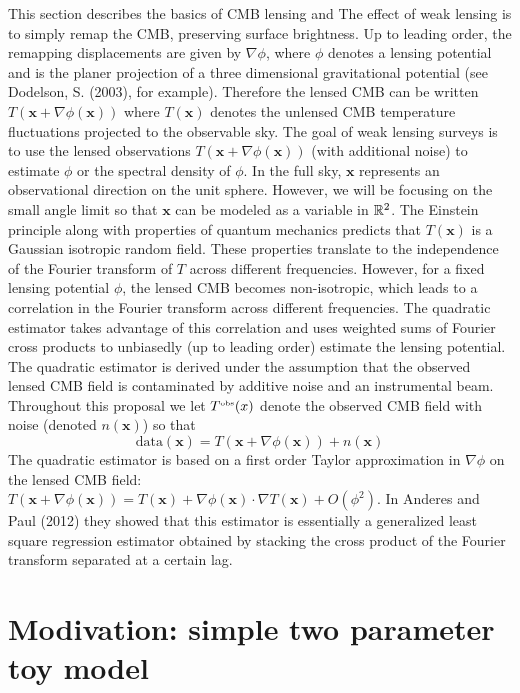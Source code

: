 \documentclass[noinfoline]{imsart}
\newcommand{\bx}{\boldsymbol x}
\begin{document}
This section describes the  basics of CMB lensing and The effect of weak lensing is to simply remap the CMB, preserving surface brightness.   Up to leading order, the remapping  displacements are given by $\nabla \phi$, where $\phi$ denotes a lensing potential and is the planer projection of a three dimensional gravitational potential (see Dodelson, S. (2003), for example). Therefore the lensed CMB can  be written $T(\bx + \nabla \phi(\bx))$ where $T(\bx)$ denotes the unlensed CMB temperature fluctuations projected to the observable sky.
The goal of weak lensing surveys is to use the lensed observations $T(\bx + \nabla \phi(\bx))$  (with additional noise) to  estimate $\phi$ or the spectral density of $\phi$.  In the full sky, $\bx$ represents an observational direction on the unit sphere. However, we will be focusing on the small angle limit  so that $\bx$ can be modeled as a variable in $ \Bbb R^2$.  The Einstein principle along with properties of quantum mechanics predicts that $T(\bx)$   is a Gaussian  isotropic random field. These properties translate to  the independence of the Fourier transform of $T$ across different frequencies.
 However, for a fixed lensing potential $\phi$, the lensed CMB  becomes non-isotropic, which leads to a correlation in the Fourier transform across different frequencies. The quadratic estimator   takes advantage of this correlation and uses weighted sums of Fourier  cross products to unbiasedly (up to leading order) estimate the lensing potential.
The quadratic estimator is derived under the assumption that the observed lensed CMB field is contaminated by additive noise and an instrumental beam. Throughout this proposal we let  $T^\text{\tiny obs}(x)$ denote the observed CMB field  with  noise (denoted $n(\bx)$) so that  
\[ \text{data}(\bx)= T(\bx + \nabla \phi(\bx))+ n(\bx)
 \]
The quadratic estimator is based on a first order Taylor approximation in $\nabla \phi $ on the lensed CMB field:
$T(\bx+\nabla \phi(\bx))= T(\bx) + \nabla \phi(\bx)\cdot \nabla T(\bx)+ O(\phi^2)$. 
In Anderes and Paul (2012) they showed that this estimator is essentially  a generalized least square regression estimator obtained by stacking the cross product of the Fourier transform separated at a certain lag.


%
%
\section{Modivation: simple two parameter toy model}
\label{two parameter system}
\end{document}
